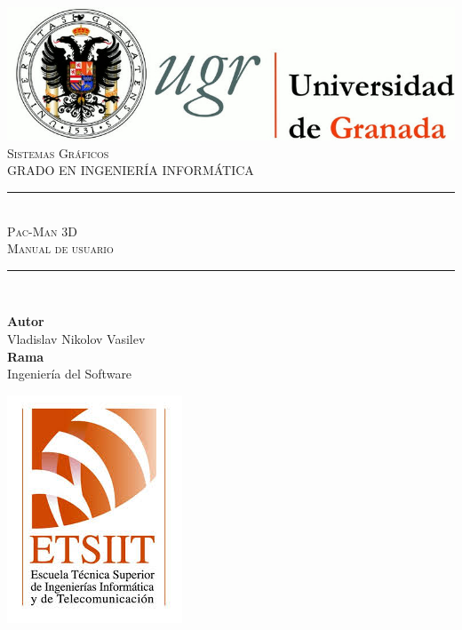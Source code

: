\documentclass[11pt,a4paper]{article}
\newcommand{\asignatura}{Sistemas Gráficos}
\newcommand{\autor}{Vladislav Nikolov Vasilev}
\newcommand{\titulo}{Pac-Man 3D}
\newcommand{\subtitulo}{Manual de usuario}
\newcommand{\rama}{Ingeniería del Software}
\begin{document}

\begin{titlepage}

\begin{minipage}{\textwidth}

\centering

\includegraphics[scale=0.3]{img/logo_ugr.jpg}\\[1cm]

\textsc{\Large \asignatura{}\\[0.2cm]}
\textsc{GRADO EN INGENIERÍA INFORMÁTICA}\\[1cm]

\noindent\rule[-1ex]{\textwidth}{1pt}\\[1.5ex]
\textsc{{\Huge \titulo\\[0.5ex]}}
\textsc{{\Large \subtitulo\\}}
\noindent\rule[-1ex]{\textwidth}{2pt}\\[3.5ex]

\end{minipage}

\vspace{0.7cm}

\begin{minipage}{\textwidth}

\centering

\textbf{Autor}\\ {\autor{}}\\[2.5ex]
\textbf{Rama}\\ {\rama}\\[2.5ex]
\vspace{0.3cm}

\includegraphics[scale=0.3]{img/etsiit.jpeg}


\end{minipage}
\end{titlepage}
\end{document}

